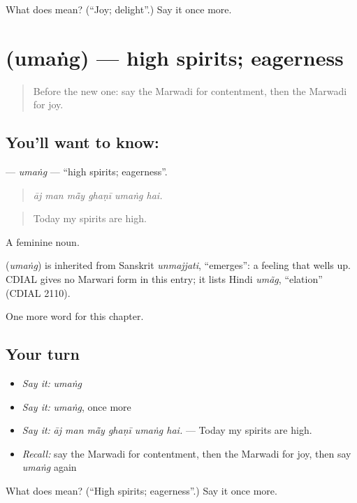 \begin{tcolorbox}[breakable,colback=teal!4,colframe=teal!35!black,title={Before you move on}]
What does  mean? (\textquotedblleft{}Joy; delight\textquotedblright{}.) Say it once more.
\end{tcolorbox}
\section[\texorpdfstring{\mw{उमंग} (umaṅg)}{उमंग (umaṅg)}]{ (umaṅg) — high spirits; eagerness}

\label{lesson:MW-C256-umang}



\begin{quote}
Before the new one: say the Marwadi for contentment, then the Marwadi for joy.
\end{quote}

\subsection*{You'll want to know: }
\textbf{} — \emph{umaṅg} — \textquotedblleft{}high spirits; eagerness\textquotedblright{}.

\begin{quote}
     
\end{quote}

\begin{quote}
\emph{āj man mā̃y ghaṇī umaṅg hai.}
\end{quote}

\begin{quote}
Today my spirits are high.
\end{quote}

A feminine noun.

\begin{cousinweb}
\textbf{} (\emph{umaṅg}) is inherited from Sanskrit \emph{unmajjati}, \textquotedblleft{}emerges\textquotedblright{}: a feeling that wells up. CDIAL gives no Marwari form in this entry; it lists Hindi \emph{umãg}, \textquotedblleft{}elation\textquotedblright{} (CDIAL 2110).
\end{cousinweb}

\begin{grammarlens}[title={What you've built}]
One more word for this chapter.
\end{grammarlens}

\subsection*{Your turn}
\begin{itemize}
\raggedright
  \item \emph{Say it:} \emph{umaṅg}
  \item \emph{Say it:} \emph{umaṅg}, once more
  \item \emph{Say it:} \emph{āj man mā̃y ghaṇī umaṅg hai.} — Today my spirits are high.
  \item \emph{Recall:} say the Marwadi for contentment, then the Marwadi for joy, then say \emph{umaṅg} again
\end{itemize}

\begin{tcolorbox}[breakable,colback=teal!4,colframe=teal!35!black,title={Before you move on}]
What does  mean? (\textquotedblleft{}High spirits; eagerness\textquotedblright{}.) Say it once more.
\end{tcolorbox}
